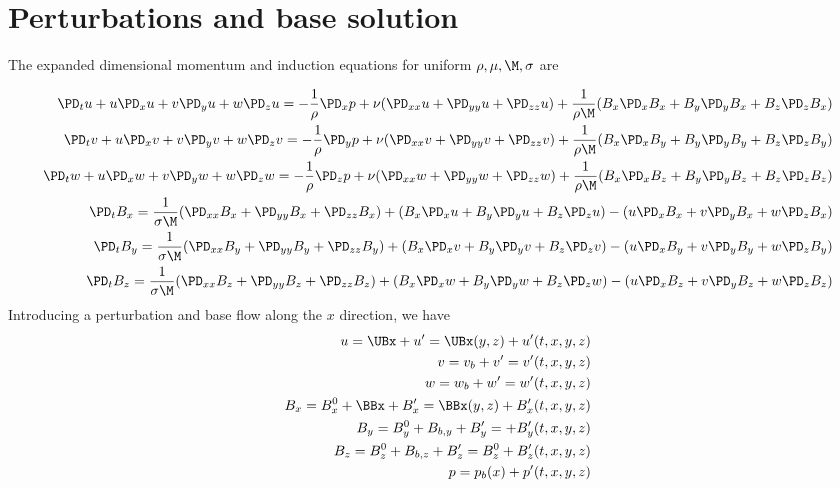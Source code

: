 \documentclass[11pt]{article}
\begin{document}
\doublespacing
\MOONSTITLE
\maketitle

\section{Perturbations and base solution}
The expanded dimensional momentum and induction equations for uniform $\rho,\mu,\M,\sigma$ are

\begin{equation}\begin{aligned}
\PD_t u+ u\PD_x u + v\PD_y u + w\PD_z u = -\frac{1}{\rho}\PD_x p+ \nu (\PD_{xx} u+\PD_{yy} u+\PD_{zz} u) + \frac{1}{\rho \M} (B_x \PD_x B_x + B_y \PD_y B_x + B_z \PD_z B_x) \\
\PD_t v+ u\PD_x v + v\PD_y v + w\PD_z v = -\frac{1}{\rho}\PD_y p+ \nu (\PD_{xx} v+\PD_{yy} v+\PD_{zz} v) + \frac{1}{\rho \M} (B_x \PD_x B_y + B_y \PD_y B_y + B_z \PD_z B_y) \\
\PD_t w+ u\PD_x w + v\PD_y w + w\PD_z w = -\frac{1}{\rho}\PD_z p+ \nu (\PD_{xx} w+\PD_{yy} w+\PD_{zz} w) + \frac{1}{\rho \M} (B_x \PD_x B_z + B_y \PD_y B_z + B_z \PD_z B_z) \\
\PD_t B_x = \frac{1}{\sigma \M} (\PD_{xx} B_x + \PD_{yy} B_x+\PD_{zz} B_x) + (B_x\PD_x u+B_y\PD_y u+B_z\PD_z u) - (u\PD_x B_x+v\PD_y B_x+w\PD_z B_x) \\
\PD_t B_y = \frac{1}{\sigma \M} (\PD_{xx} B_y + \PD_{yy} B_y+\PD_{zz} B_y) + (B_x\PD_x v+B_y\PD_y v+B_z\PD_z v) - (u\PD_x B_y+v\PD_y B_y+w\PD_z B_y) \\
\PD_t B_z = \frac{1}{\sigma \M} (\PD_{xx} B_z + \PD_{yy} B_z+\PD_{zz} B_z) + (B_x\PD_x w+B_y\PD_y w+B_z\PD_z w) - (u\PD_x B_z+v\PD_y B_z+w\PD_z B_z) \\
\end{aligned} \end{equation}
Introducing a perturbation and base flow along the $x$ direction, we have
\begin{equation}\begin{aligned}
 u = \UBx + u' = \UBx(y,z) + u'(t,x,y,z) \\
 v = v_b + v' =            v'(t,x,y,z) \\
 w = w_b + w' =            w'(t,x,y,z) \\
 B_x = B_x^0 + \BBx + B_x'    = \BBx(y,z) + B_x'(t,x,y,z) \\
 B_y = B_y^0 + B_{b,y} + B_y' =           + B_y'(t,x,y,z) \\
 B_z = B_z^0 + B_{b,z} + B_z' = B_z^0     + B_z'(t,x,y,z) \\
 p   = p_b(x) + p'(t,x,y,z) \\
\end{aligned} \end{equation}
\end{document}
